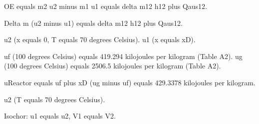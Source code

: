 OE equals m2 u2 minus m1 u1 equals delta m12 h12 plus Qaus12.  

Delta m (u2 minus u1) equals delta m12 h12 plus Qaus12.  

u2 (x equals 0, T equals 70 degrees Celsius).  
u1 (x equals xD).  

uf (100 degrees Celsius) equals 419.294 kilojoules per kilogram (Table A2).  
ug (100 degrees Celsius) equals 2506.5 kilojoules per kilogram (Table A2).  

uReactor equals uf plus xD (ug minus uf) equals 429.3378 kilojoules per kilogram.  

u2 (T equals 70 degrees Celsius).  

Isochor: u1 equals u2, V1 equals V2.